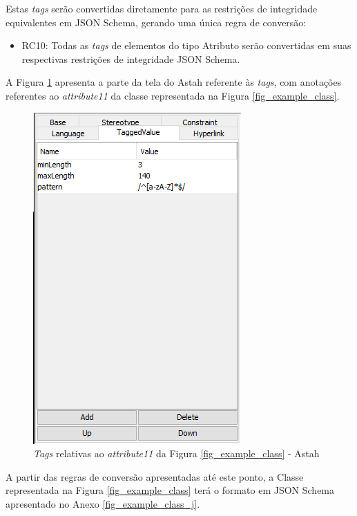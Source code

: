 Estas \textit{tags} serão convertidas diretamente para as restrições de integridade equivalentes em JSON Schema, gerando uma única regra de conversão:

\begin{itemize}
    \item RC10: Todas as \textit{tags} de elementos do tipo Atributo serão convertidas em suas respectivas restrições de integridade JSON Schema.
\end{itemize}

A Figura \ref{fig_example_tags} apresenta a parte da tela do Astah referente às \textit{tags}, com anotações referentes ao \textit{attribute11} da classe representada na Figura \ref{fig_example_class}.

\begin{figure}[htb]
    \begin{center}
        \includegraphics[scale=0.7]{imagens/Example_Tags.png}
    \end{center}
	\caption{\label{fig_example_tags}\textit{Tags} relativas ao \textit{attribute11} da Figura \ref{fig_example_class} - Astah}
\end{figure}

A partir das regras de conversão apresentadas até este ponto, a Classe representada na Figura \ref{fig_example_class} terá o formato em JSON Schema apresentado no Anexo \ref{fig_example_class_j}.

